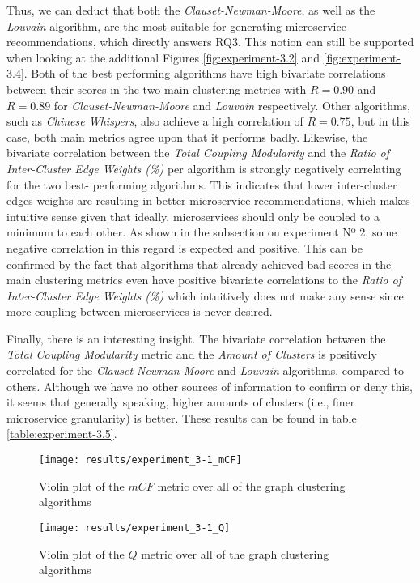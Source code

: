 \documentclass[12pt,a4paper]{report}
\begin{document}
Thus, we can deduct that both the \textit{Clauset-Newman-Moore}, as well as the
\textit{Louvain} algorithm, are the most suitable for generating microservice
recommendations, which directly answers RQ3. This notion can still be supported
when looking at the additional Figures \ref{fig:experiment-3.2} and
\ref{fig:experiment-3.4}. Both of the best performing algorithms have high bivariate
correlations between their scores in the two main clustering metrics with \(R =
0.90\) and \(R = 0.89\) for \textit{Clauset-Newman-Moore} and \textit{Louvain}
respectively. Other algorithms, such as \textit{Chinese Whispers}, also achieve
a high correlation of \(R = 0.75\), but in this case, both main metrics agree
upon that it performs badly. Likewise, the bivariate correlation between the
\textit{Total Coupling Modularity} and the \textit{Ratio of Inter-Cluster Edge Weights (\%)}
per algorithm is strongly negatively correlating for the two best\hyp
performing algorithms. This indicates that lower inter-cluster edges weights
are resulting in better microservice recommendations, which makes intuitive
sense given that ideally, microservices should only be coupled to a minimum to
each other. As shown in the subsection on experiment Nº 2, some negative
correlation in this regard is expected and positive. This can be confirmed by
the fact that algorithms that already achieved bad scores in the main
clustering metrics even have positive bivariate correlations to the
\textit{Ratio of Inter-Cluster Edge Weights (\%)} which intuitively
does not make any sense since more coupling between microservices is never desired.

Finally, there is an interesting insight. The bivariate correlation between the
\textit{Total Coupling Modularity} metric and the \textit{Amount of Clusters}
is positively correlated for the \textit{Clauset-Newman-Moore} and
\textit{Louvain} algorithms, compared to others. Although we have no other
sources of information to confirm or deny this, it seems that generally speaking,
higher amounts of clusters (i.e., finer microservice granularity) is better.
These results can be found in table \ref{table:experiment-3.5}.

\begin{figure}[htbp]
\centering
\texttt{[image: results/experiment\_3-1\_mCF]}
\caption{Violin plot of the $mCF$ metric over all of the graph clustering algorithms}
\label{fig:experiment-3.1_mCF}
\end{figure}

\begin{figure}[htbp]
\centering
\texttt{[image: results/experiment\_3-1\_Q]}
\caption{Violin plot of the $Q$ metric over all of the graph clustering algorithms}
\label{fig:experiment-3.1_Q}
\end{figure}
\end{document}
